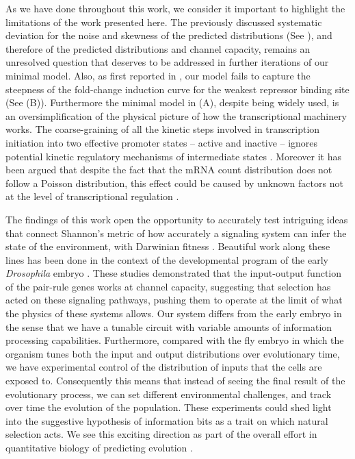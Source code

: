 As we have done throughout this work, we consider it important to highlight the
limitations of the work presented here. The previously discussed systematic
deviation for the noise and skewness of the predicted distributions (See
), and therefore of the predicted distributions and
channel capacity, remains an unresolved question that deserves to be addressed
in further iterations of our minimal model. Also, as first reported in
\cite{Razo-Mejia2018}, our model fails to capture the steepness of the
fold-change induction curve for the weakest repressor binding site (See
(B)). Furthermore the minimal model in
(A), despite being widely used, is an
oversimplification of the physical picture of how the transcriptional machinery
works. The coarse-graining of all the kinetic steps involved in transcription
initiation into two effective promoter states -- active and inactive -- ignores
potential kinetic regulatory mechanisms of intermediate states
\cite{Scholes2017}. Moreover it has been argued that despite the fact that the
mRNA count distribution does not follow a Poisson distribution, this effect
could be caused by unknown factors not at the level of transcriptional
regulation \cite{Choubey2018}.

The findings of this work open the opportunity to accurately test intriguing
ideas that connect Shannon's metric of how accurately a signaling system can
infer the state of the environment, with Darwinian fitness \cite{Taylor2007}.
Beautiful work along these lines has been done in the context of the
developmental program of the early {\it Drosophila} embryo \cite{Tkacik2008,
Petkova2019}. These studies demonstrated that the input-output function of the
pair-rule genes works at channel capacity, suggesting that selection has acted
on these signaling pathways, pushing them to operate at the limit of what the
physics of these systems allows. Our system differs from the early embryo in
the sense that we have a tunable circuit with variable amounts of information
processing capabilities. Furthermore, compared with the fly embryo in which the
organism tunes both the input and output distributions over evolutionary time,
we have experimental control of the distribution of inputs that the cells are
exposed to. Consequently this means that instead of seeing the final result of
the evolutionary process, we can set different environmental challenges, and
track over time the evolution of the population. These experiments could shed
light into the suggestive hypothesis of information bits as a trait on which
natural selection acts. We see this exciting direction as part of the overall
effort in quantitative biology of predicting evolution \cite{Lassig2017}.